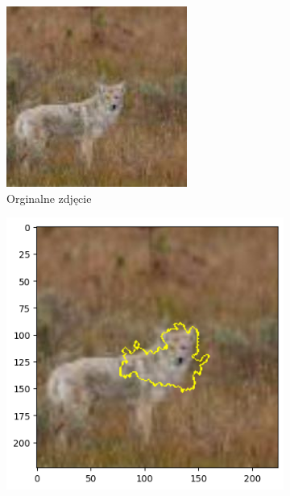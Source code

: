 \begin{figure}[h]
	\centering
	\begin{subfigure}[b]{0.3\textwidth}
		\includegraphics[width=.9\textwidth]{img/examples/appendix/n02114855_39555}
		\caption{Orginalne zdjęcie}  \label{}
	\end{subfigure}
	\begin{subfigure}[b]{0.3\textwidth}
		\centering\includegraphics[width=.9\textwidth]{img/examples/appendix/n02114855_39555_lime}

\end{subfigure}
\end{figure}
